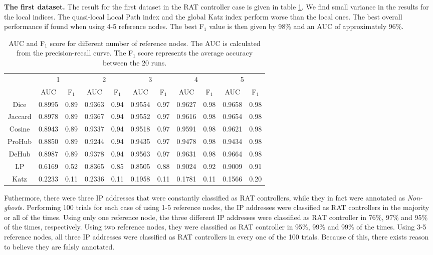 \textbf{The first dataset.} The result for the first dataset in the RAT controller case is given in table \ref{aucIndex}. We find small variance in the results for the local indices. The quasi-local Local Path index and the global Katz index perform worse than the local ones. The best overall performance if found when using 4-5 reference nodes. The best F$_1$ value is then given by 98\% and an AUC of approximately 96\%. 

\begin{table}[h!]
    \centering
    \caption{AUC and F$_1$ score for different number of reference nodes. The AUC is calculated from the precision-recall curve. The F$_1$ score represents the average accuracy between the 20 runs.}
    \begin{tabular}{|c||c|c||c|c||c|c||c|c||c|c|}
      \hline
      \multirow{2}{*}{~} 
            & \multicolumn{2}{c||}{1}
            & \multicolumn{2}{c||}{2}
            & \multicolumn{2}{c||}{3}
            & \multicolumn{2}{c||}{4}
            & \multicolumn{2}{|c|}{5} \\             \cline{2-11}
      ~     &AUC&F$_1$&AUC&F$_1$&AUC&F$_1$&AUC&F$_1$&AUC&F$_1$ \\ \hline
    Dice    &0.8995 & 0.89 & 0.9363 &0.94 &0.9554&0.97 & 0.9627 &0.98&0.9658 & 0.98 \\
    Jaccard &0.8978 & 0.89 & 0.9367 &0.94 &0.9552&0.97 & 0.9616 &0.98&0.9654 & 0.98 \\
    Cosine  &0.8943 & 0.89 & 0.9337 &0.94 &0.9518&0.97 & 0.9591 &0.98&0.9621 & 0.98 \\
    ProHub  &0.8850 & 0.89 & 0.9244 &0.94 &0.9435&0.97 & 0.9478 &0.98&0.9434 & 0.98 \\
    DeHub   &0.8987 & 0.89 & 0.9378 &0.94 &0.9563&0.97 & 0.9631 &0.98&0.9664 & 0.98 \\
    LP      &0.6169 & 0.52 & 0.8365 & 0.85 & 0.8505 & 0.88 & 0.9024 & 0.92 & 0.9009 & 0.91 \\ 
    Katz    &0.2233 & 0.11 & 0.2336 & 0.11 & 0.1958 & 0.11 & 0.1781 & 0.11 & 0.1566 & 0.20 \\ \hline
    \end{tabular}
    \label{aucIndex}
\end{table}

Futhermore, there were three IP addresses that were constantly classified as RAT controllers, while they in fact were annotated as \textit{Non-ghost}s. Performing 100 trials for each case of using 1-5 reference nodes, the IP addresses were classified as RAT controllers in the majority or all of the times. Using only one reference node, the three different IP addresses were classified as RAT controller in 76\%, 97\% and 95\% of the times, respectively. Using two reference nodes, they were classified as RAT controller in 95\%, 99\% and 99\% of the times. Using 3-5 reference nodes, all three IP addresses were classified as RAT controllers in every one of the 100 trials. Because of this, there exists reason to believe they are falsly annotated. 

